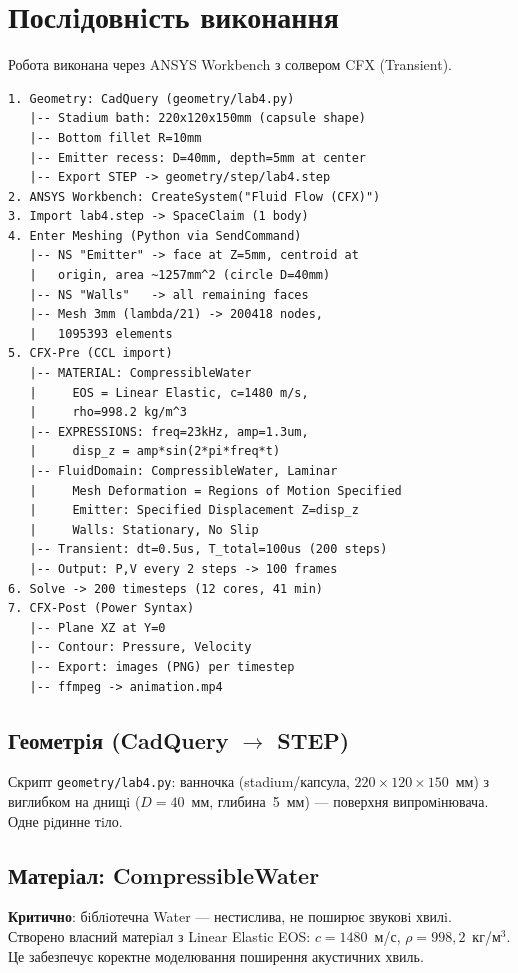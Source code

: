 \section{Послiдовнiсть виконання}

Робота виконана через ANSYS Workbench з солвером CFX (Transient).

\begin{lstlisting}[style=scheme]
1. Geometry: CadQuery (geometry/lab4.py)
   |-- Stadium bath: 220x120x150mm (capsule shape)
   |-- Bottom fillet R=10mm
   |-- Emitter recess: D=40mm, depth=5mm at center
   |-- Export STEP -> geometry/step/lab4.step
2. ANSYS Workbench: CreateSystem("Fluid Flow (CFX)")
3. Import lab4.step -> SpaceClaim (1 body)
4. Enter Meshing (Python via SendCommand)
   |-- NS "Emitter" -> face at Z=5mm, centroid at
   |   origin, area ~1257mm^2 (circle D=40mm)
   |-- NS "Walls"   -> all remaining faces
   |-- Mesh 3mm (lambda/21) -> 200418 nodes,
   |   1095393 elements
5. CFX-Pre (CCL import)
   |-- MATERIAL: CompressibleWater
   |     EOS = Linear Elastic, c=1480 m/s,
   |     rho=998.2 kg/m^3
   |-- EXPRESSIONS: freq=23kHz, amp=1.3um,
   |     disp_z = amp*sin(2*pi*freq*t)
   |-- FluidDomain: CompressibleWater, Laminar
   |     Mesh Deformation = Regions of Motion Specified
   |     Emitter: Specified Displacement Z=disp_z
   |     Walls: Stationary, No Slip
   |-- Transient: dt=0.5us, T_total=100us (200 steps)
   |-- Output: P,V every 2 steps -> 100 frames
6. Solve -> 200 timesteps (12 cores, 41 min)
7. CFX-Post (Power Syntax)
   |-- Plane XZ at Y=0
   |-- Contour: Pressure, Velocity
   |-- Export: images (PNG) per timestep
   |-- ffmpeg -> animation.mp4
\end{lstlisting}

\subsection{Геометрiя (CadQuery $\to$ STEP)}

Скрипт \texttt{geometry/lab4.py}: ванночка (stadium/капсула, $220 \times 120 \times 150$~мм) з виглибком на днищi ($D=40$~мм, глибина~5~мм) --- поверхня випромiнювача. Одне рiдинне тiло.

\subsection{Матерiал: CompressibleWater}

\textbf{Критично}: бiблiотечна Water --- нестислива, не поширює звуковi хвилi. Створено власний матерiал з Linear Elastic EOS: $c = 1480$~м/с, $\rho = 998{,}2$~кг/м$^3$. Це забезпечує коректне моделювання поширення акустичних хвиль.

